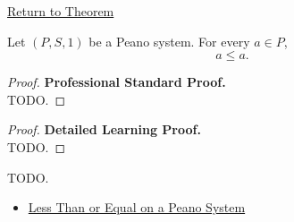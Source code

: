 \newpage
{}
\label{prf:order-reflexive-on-peano-system}

\begin{remark*}[Return]
\hyperref[thm:order-reflexive-on-peano-system]{Return to Theorem}
\end{remark*}

\begin{theorem*}
Let $(P,S,1)$ be a Peano system. For every $a \in P$,
\[
a \le a.
\]
\end{theorem*}

\begin{proof}
\textbf{Professional Standard Proof.}~\\
TODO.
\end{proof}

\begin{proof}
\textbf{Detailed Learning Proof.}~\\
TODO.
\end{proof}

\begin{remark*}
TODO.
\end{remark*}

\begin{dependencies}
\begin{itemize}
  \item \hyperref[def:less-than-or-equal-on-peano-system]{Less Than or Equal on a Peano System}
\end{itemize}
\end{dependencies}
